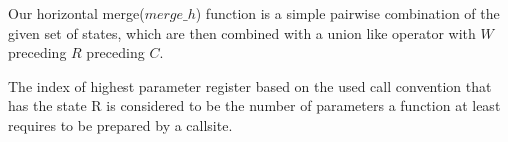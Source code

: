 Our horizontal merge($merge\_h$) function is a simple pairwise combination of the given set of states, which are then combined with a union like operator with $W$ preceding $R$ preceding $C$.


The index of highest parameter register based on the used call convention that has the state R is considered to be the number of parameters a function at least requires to be prepared by a callsite.

%
%
%
%


